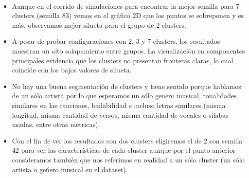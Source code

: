 \documentclass[11pt]{article}
\providecommand{\tightlist}{%
      \setlength{\itemsep}{0pt}\setlength{\parskip}{0pt}}
\begin{document}
    \begin{center}
    \end{center}
    { \hspace*{\fill} \\}
    
    \begin{itemize}
\tightlist
\item
  Aunque en el corrido de simulaciones para encontrar la mejor semilla
  para 7 clusters (semilla 83) vemos en el gráfico 2D que los puntos se
  sobreponen y es más, observamos mejor silueta para el grupo de 2
  clusters.
\item
  A pesar de probar configuraciones con 2, 3 y 7 clusters, los
  resultados muestran un alto solapamiento entre grupos. La
  visualización en componentes principales evidencia que los clusters no
  presentan fronteras claras, lo cual coincide con los bajos valores de
  silueta.
\item
  No hay una buena segmentación de clusters y tiene sentido porque
  hablamos de un sólo artista por lo que esperamos un sólo genero
  musical, tonalidades similares en las canciones, bailabilidad e
  incluso letras similares (misma longitud, misma cantidad de versos,
  misma cantidad de vocales o sílabas usadas, entre otras métricas).
\item
  Con el fin de ver los resultados con dos clusters eligiremos el de 2
  con semilla 42 para ver las características de cada cluster aunque por
  el punto anterior consideramos también que nos referimos en realidad a
  un sólo cluster (un sólo artista o geńero musical en el dataset).
\end{itemize}
\end{document}
